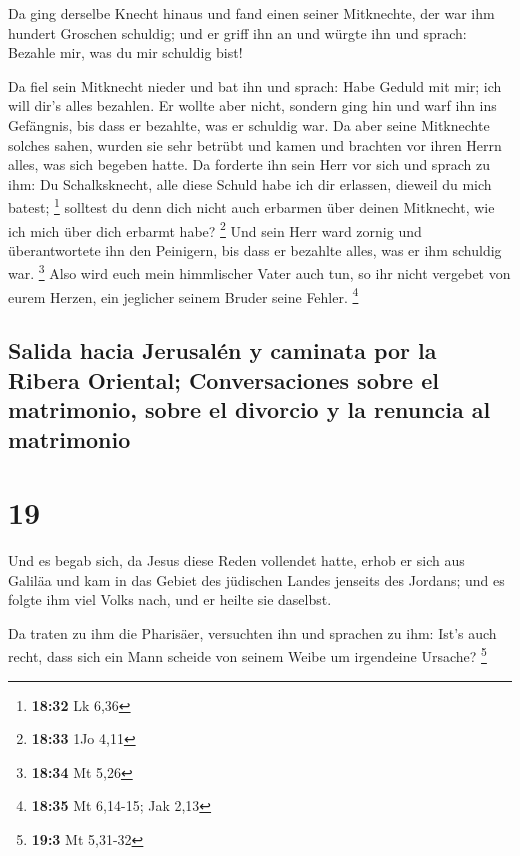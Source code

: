  Da ging derselbe Knecht hinaus und fand einen seiner
Mitknechte, der war ihm hundert Groschen schuldig; und er griff ihn an
und würgte ihn und sprach: Bezahle mir, was du mir schuldig bist!

 Da fiel sein Mitknecht nieder und bat ihn und sprach:
Habe Geduld mit mir; ich will dir's alles bezahlen.  Er
wollte aber nicht, sondern ging hin und warf ihn ins Gefängnis, bis dass
er bezahlte, was er schuldig war.  Da aber seine
Mitknechte solches sahen, wurden sie sehr betrübt und kamen und brachten
vor ihren Herrn alles, was sich begeben hatte.  Da
forderte ihn sein Herr vor sich und sprach zu ihm: Du Schalksknecht,
alle diese Schuld habe ich dir erlassen, dieweil du mich batest;
\footnote{\textbf{18:32} Lk 6,36}  solltest du denn dich
nicht auch erbarmen über deinen Mitknecht, wie ich mich über dich
erbarmt habe? \footnote{\textbf{18:33} 1Jo 4,11}  Und
sein Herr ward zornig und überantwortete ihn den Peinigern, bis dass er
bezahlte alles, was er ihm schuldig war. \footnote{\textbf{18:34} Mt
  5,26}  Also wird euch mein himmlischer Vater auch tun,
so ihr nicht vergebet von eurem Herzen, ein jeglicher seinem Bruder
seine Fehler. \footnote{\textbf{18:35} Mt 6,14-15; Jak 2,13}

\hypertarget{salida-hacia-jerusaluxe9n-y-caminata-por-la-ribera-oriental-conversaciones-sobre-el-matrimonio-sobre-el-divorcio-y-la-renuncia-al-matrimonio}{%
\subsection{Salida hacia Jerusalén y caminata por la Ribera Oriental;
Conversaciones sobre el matrimonio, sobre el divorcio y la renuncia al
matrimonio}\label{salida-hacia-jerusaluxe9n-y-caminata-por-la-ribera-oriental-conversaciones-sobre-el-matrimonio-sobre-el-divorcio-y-la-renuncia-al-matrimonio}}

\hypertarget{section-18}{%
\section{19}\label{section-18}}

 Und es begab sich, da Jesus diese Reden vollendet hatte,
erhob er sich aus Galiläa und kam in das Gebiet des jüdischen Landes
jenseits des Jordans;  und es folgte ihm viel Volks nach,
und er heilte sie daselbst.

 Da traten zu ihm die Pharisäer, versuchten ihn und
sprachen zu ihm: Ist's auch recht, dass sich ein Mann scheide von seinem
Weibe um irgendeine Ursache? \footnote{\textbf{19:3} Mt 5,31-32}

